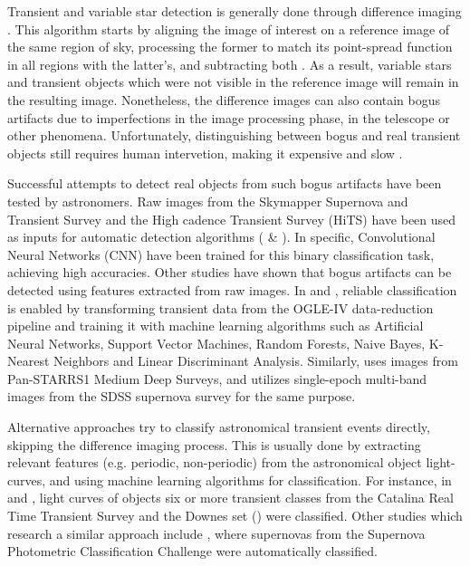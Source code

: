 Transient and variable star detection is generally done through 
difference imaging \citep{1507.05137,1608.01733,1708.02850}. 
This algorithm starts by aligning the image of interest on a reference image of the
same region of sky, processing the former to match its point-spread
function in all regions with the latter's, and subtracting both
\citep{astro-ph/9712287}. 
As a result, variable stars and transient objects which were not
visible in the reference image will remain in the resulting
image. 
Nonetheless, the difference images can also contain bogus
artifacts due to imperfections in the image processing
phase, in the telescope or other phenomena. 
Unfortunately, distinguishing between bogus and real transient objects
still requires human intervetion, making it expensive and slow
\citep{2011arXiv1110.4655D}.  


Successful attempts to detect real objects from such bogus artifacts have been tested by astronomers. Raw images from the  Skymapper Supernova and Transient Survey and the High cadence Transient Survey (HiTS) have been used as inputs for automatic detection algorithms (\cite{1708.08947} \& \cite{1701.00458}). In specific, Convolutional Neural Networks (CNN) have been trained for this binary classification task, achieving high accuracies. Other studies have shown that bogus artifacts can be detected using features extracted from raw images. In \cite{1601.06151} and \cite{1601.06320}, reliable classification is enabled by transforming transient data from the OGLE-IV data-reduction pipeline and training it with machine learning algorithms such as Artificial Neural Networks, Support Vector Machines, Random Forests, Naive Bayes, K-Nearest Neighbors and Linear Discriminant Analysis. Similarly, \cite{1501.05470} uses images from Pan-STARRS1 Medium Deep Surveys, and \cite{1407.4118} utilizes single-epoch multi-band images from the SDSS supernova survey for the same purpose.



Alternative approaches try to classify astronomical transient events directly, skipping the difference imaging process.
This is usually done by extracting relevant features (e.g. periodic, non-periodic) from the astronomical object light-curves, and using machine learning algorithms for classification. For instance, in \cite{1401.3211} and \cite{1601.03931}, light curves of objects six or more transient classes from the Catalina Real Time Transient Survey and the Downes set (\cite{d05}) were classified. Other studies which research a similar approach include \cite{1603.00882}, where supernovas from the Supernova Photometric Classification Challenge were automatically classified.

